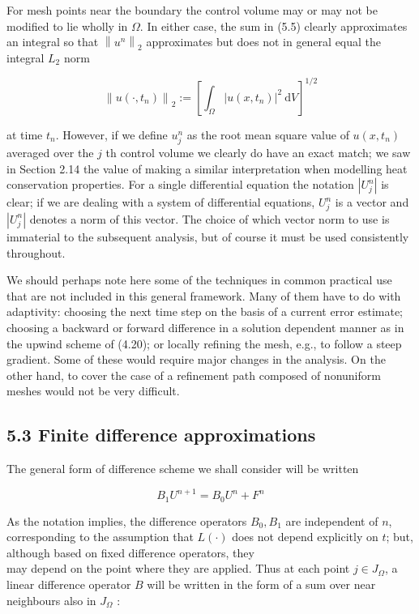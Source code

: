 \documentclass[10pt]{article}
\begin{document}
For mesh points near the boundary the control volume may or may not be modified to lie wholly in \(\Omega\). In either case, the sum in (5.5) clearly approximates an integral so that \(\left\|u^{n}\right\|_{2}\) approximates but does not in general equal the integral \(L_{2}\) norm

\[
\left\|u\left(\cdot, t_{n}\right)\right\|_{2}:=\left[\int_{\Omega}\left|u\left(x, t_{n}\right)\right|^{2} \mathrm{~d} V\right]^{1 / 2}
\]

at time \(t_{n}\). However, if we define \(u_{j}^{n}\) as the root mean square value of \(u\left(x, t_{n}\right)\) averaged over the \(j\) th control volume we clearly do have an exact match; we saw in Section 2.14 the value of making a similar interpretation when modelling heat conservation properties. For a single differential equation the notation \(\left|U_{j}^{n}\right|\) is clear; if we are dealing with a system of differential equations, \(U_{j}^{n}\) is a vector and \(\left|U_{j}^{n}\right|\) denotes a norm of this vector. The choice of which vector norm to use is immaterial to the subsequent analysis, but of course it must be used consistently throughout.

We should perhaps note here some of the techniques in common practical use that are not included in this general framework. Many of them have to do with adaptivity: choosing the next time step on the basis of a current error estimate; choosing a backward or forward difference in a solution dependent manner as in the upwind scheme of (4.20); or locally refining the mesh, e.g., to follow a steep gradient. Some of these would require major changes in the analysis. On the other hand, to cover the case of a refinement path composed of nonuniform meshes would not be very difficult.

\subsection*{5.3 Finite difference approximations}
The general form of difference scheme we shall consider will be written

\[
B_{1} U^{n+1}=B_{0} U^{n}+F^{n}
\]

As the notation implies, the difference operators \(B_{0}, B_{1}\) are independent of \(n\), corresponding to the assumption that \(L(\cdot)\) does not depend explicitly on \(t\); but, although based on fixed difference operators, they\\
may depend on the point where they are applied. Thus at each point \(j \in J_{\Omega}\), a linear difference operator \(B\) will be written in the form of a sum over near neighbours also in \(J_{\Omega}\) :
\end{document}
